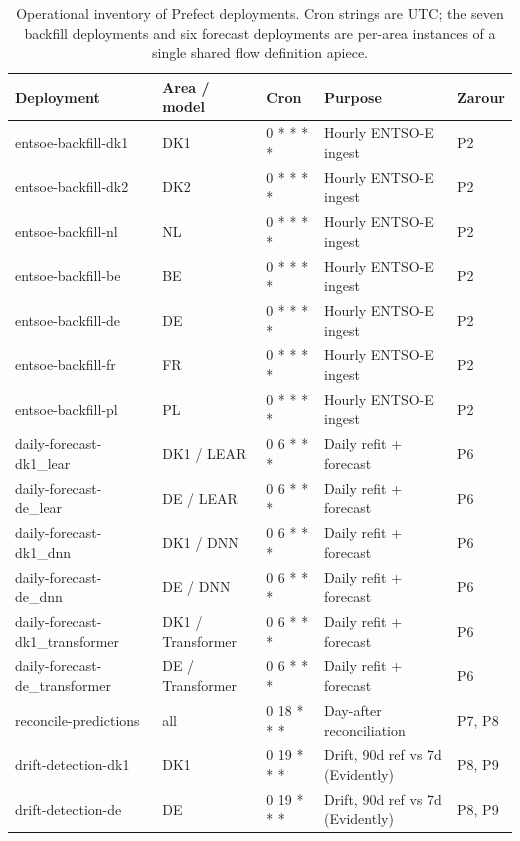 \begin{table}[H]
  \centering
  \scriptsize
  \caption{Operational inventory of Prefect deployments. Cron strings are UTC; the seven backfill deployments and six forecast deployments are per-area instances of a single shared flow definition apiece.}
  \label{tab:inventory}
  \setlength{\tabcolsep}{4pt}
  \renewcommand{\arraystretch}{1.2}
  \begin{tabularx}{\linewidth}{@{}>{\raggedright\arraybackslash}p{2.8cm} l l >{\raggedright\arraybackslash}X l@{}}
    \toprule
    \textbf{Deployment} & \textbf{Area / model} & \textbf{Cron} & \textbf{Purpose} & \textbf{Zarour} \\
    \midrule
    entsoe-backfill-dk1 & DK1 & 0 * * * * & Hourly ENTSO-E ingest & P2 \\
    entsoe-backfill-dk2 & DK2 & 0 * * * * & Hourly ENTSO-E ingest & P2 \\
    entsoe-backfill-nl  & NL  & 0 * * * * & Hourly ENTSO-E ingest & P2 \\
    entsoe-backfill-be  & BE  & 0 * * * * & Hourly ENTSO-E ingest & P2 \\
    entsoe-backfill-de  & DE  & 0 * * * * & Hourly ENTSO-E ingest & P2 \\
    entsoe-backfill-fr  & FR  & 0 * * * * & Hourly ENTSO-E ingest & P2 \\
    entsoe-backfill-pl  & PL  & 0 * * * * & Hourly ENTSO-E ingest & P2 \\
    \midrule
    daily-forecast-dk1\_lear        & DK1 / LEAR        & 0 6 * * * & Daily refit + forecast & P6 \\
    daily-forecast-de\_lear         & DE / LEAR         & 0 6 * * * & Daily refit + forecast & P6 \\
    daily-forecast-dk1\_dnn         & DK1 / DNN         & 0 6 * * * & Daily refit + forecast & P6 \\
    daily-forecast-de\_dnn          & DE / DNN          & 0 6 * * * & Daily refit + forecast & P6 \\
    daily-forecast-dk1\_transformer & DK1 / Transformer & 0 6 * * * & Daily refit + forecast & P6 \\
    daily-forecast-de\_transformer  & DE / Transformer  & 0 6 * * * & Daily refit + forecast & P6 \\
    \midrule
    reconcile-predictions & all & 0 18 * * * & Day-after reconciliation & P7, P8 \\
    \midrule
    drift-detection-dk1 & DK1 & 0 19 * * * & Drift, 90d ref vs 7d (Evidently) & P8, P9 \\
    drift-detection-de  & DE  & 0 19 * * * & Drift, 90d ref vs 7d (Evidently) & P8, P9 \\
    \bottomrule
  \end{tabularx}
\end{table}

